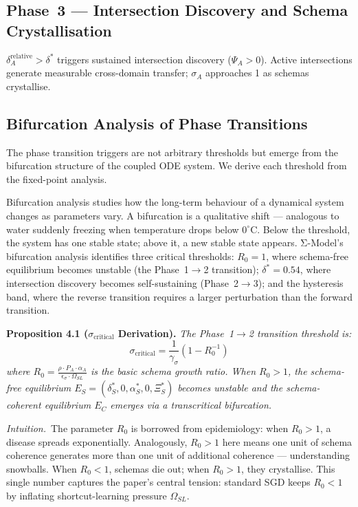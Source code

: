 \documentclass[11pt]{article}
\theoremstyle{definition}
\theoremstyle{plain}
\begin{document}
\subsection*{Phase~3 --- Intersection Discovery and Schema Crystallisation}

$\delta_A^{\text{relative}} > \delta^*$ triggers sustained intersection
discovery ($\Psi_A > 0$). Active intersections generate measurable
cross-domain transfer; $\sigma_A$ approaches 1 as schemas crystallise.

\subsection{Bifurcation Analysis of Phase Transitions}\label{sec:bifurcation}

The phase transition triggers are not arbitrary thresholds but emerge from
the bifurcation structure of the coupled ODE system. We derive each
threshold from the fixed-point analysis.

Bifurcation analysis \citep{kuznetsov1998} studies how the long-term behaviour of a dynamical system changes as parameters vary. A bifurcation is a qualitative shift --- analogous to water suddenly freezing when temperature drops below $0^\circ$C. Below the threshold, the system has one stable state; above it, a new stable state appears. Σ-Model's bifurcation analysis identifies three critical thresholds: $R_0 = 1$, where schema-free equilibrium becomes unstable (the Phase~1$\to$2 transition); $\delta^* = 0.54$, where intersection discovery becomes self-sustaining (Phase~2$\to$3); and the hysteresis band, where the reverse transition requires a larger perturbation than the forward transition.

\textbf{Proposition 4.1 ($\sigma_{\text{critical}}$ Derivation).} %
\textit{The Phase~1$\to$2 transition threshold is:
\begin{equation}\label{eq:sigma-critical-derived}
\sigma_{\text{critical}} = \frac{1}{\gamma_\sigma}(1 - R_0^{-1})
\end{equation}
where $R_0 = \frac{\rho \cdot P_A \cdot \alpha_A}{\epsilon_\sigma \cdot \Omega_{SL}}$ is the
basic schema growth ratio. When $R_0 > 1$, the schema-free
equilibrium $E_S = (\delta_S^*, 0, \alpha_S^*, 0, \Xi_S^*)$ becomes unstable
and the schema-coherent equilibrium $E_C$ emerges via a transcritical
bifurcation.}

\noindent\textit{Intuition.}\ The parameter $R_0$ is borrowed from
epidemiology: when $R_0 > 1$, a disease spreads exponentially.
Analogously, $R_0 > 1$ here means one unit of schema coherence generates
more than one unit of additional coherence --- understanding snowballs.
When $R_0 < 1$, schemas die out; when $R_0 > 1$, they crystallise.
This single number captures the paper's central tension: standard SGD
keeps $R_0 < 1$ by inflating shortcut-learning pressure $\Omega_{SL}$.
\end{document}
